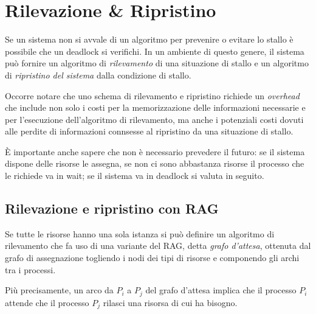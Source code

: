 \documentclass[a4paper,12pt, twoside]{report}
\begin{document}
\section{Rilevazione \& Ripristino}
Se un sistema non si avvale di un algoritmo per prevenire o evitare lo stallo \`e possibile che un deadlock si verifichi. In un ambiente di questo genere, il sistema pu\`o fornire un algoritmo di \emph{rilevamento} di una situazione di stallo e un algoritmo di \emph{ripristino del sistema} dalla condizione di stallo.

Occorre notare che uno schema di rilevamento e ripristino richiede un \emph{overhead} che include non solo i costi per la memorizzazione delle informazioni necessarie e per l'esecuzione dell'algoritmo di rilevamento, ma anche i potenziali costi dovuti alle perdite di informazioni connsesse al ripristino da una situazione di stallo. 

\`E importante anche sapere che non \`e necessario prevedere il futuro: se il sistema dispone delle risorse le assegna, se non ci sono abbastanza risorse il processo che le richiede va in wait; se il sistema va in deadlock si valuta in seguito.

\subsection{Rilevazione e ripristino con RAG}

Se tutte le risorse hanno una sola istanza si pu\`o definire un algoritmo di rilevamento che fa uso di una variante del RAG, detta \emph{grafo d'attesa}, ottenuta dal grafo di assegnazione togliendo i nodi dei tipi di risorse e componendo gli archi tra i processi.

Pi\`u precisamente, un arco da $P_i$ a $P_j$ del grafo d'attesa implica che il processo $P_i$ attende che il processo $P_j$ rilasci una risorsa di cui ha bisogno. 
\end{document}
